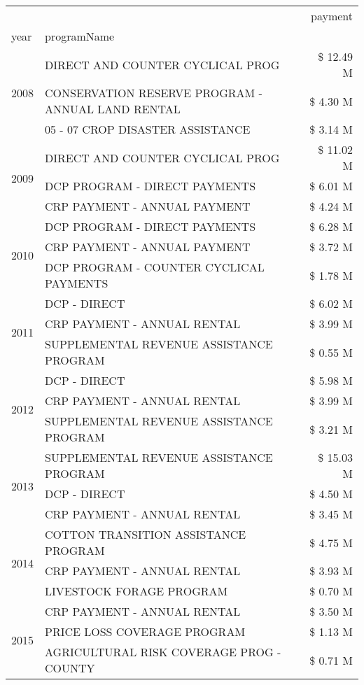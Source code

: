 \begin{tabular}{llr}
\toprule
 &  & payment \\
year & programName &  \\
\midrule
\multirow[t]{3}{*}{2008} & DIRECT AND COUNTER CYCLICAL PROG & \$ 12.49 M \\
 & CONSERVATION RESERVE PROGRAM - ANNUAL LAND RENTAL & \$ 4.30 M \\
 & 05 - 07 CROP DISASTER ASSISTANCE & \$ 3.14 M \\
\cline{1-3}
\multirow[t]{3}{*}{2009} & DIRECT AND COUNTER CYCLICAL PROG & \$ 11.02 M \\
 & DCP PROGRAM - DIRECT PAYMENTS & \$ 6.01 M \\
 & CRP PAYMENT - ANNUAL PAYMENT & \$ 4.24 M \\
\cline{1-3}
\multirow[t]{3}{*}{2010} & DCP PROGRAM - DIRECT PAYMENTS & \$ 6.28 M \\
 & CRP PAYMENT - ANNUAL PAYMENT & \$ 3.72 M \\
 & DCP PROGRAM - COUNTER CYCLICAL PAYMENTS & \$ 1.78 M \\
\cline{1-3}
\multirow[t]{3}{*}{2011} & DCP - DIRECT & \$ 6.02 M \\
 & CRP PAYMENT - ANNUAL RENTAL & \$ 3.99 M \\
 & SUPPLEMENTAL REVENUE ASSISTANCE PROGRAM & \$ 0.55 M \\
\cline{1-3}
\multirow[t]{3}{*}{2012} & DCP - DIRECT & \$ 5.98 M \\
 & CRP PAYMENT - ANNUAL RENTAL & \$ 3.99 M \\
 & SUPPLEMENTAL REVENUE ASSISTANCE PROGRAM & \$ 3.21 M \\
\cline{1-3}
\multirow[t]{3}{*}{2013} & SUPPLEMENTAL REVENUE ASSISTANCE PROGRAM & \$ 15.03 M \\
 & DCP - DIRECT & \$ 4.50 M \\
 & CRP PAYMENT - ANNUAL RENTAL & \$ 3.45 M \\
\cline{1-3}
\multirow[t]{3}{*}{2014} & COTTON TRANSITION ASSISTANCE PROGRAM & \$ 4.75 M \\
 & CRP PAYMENT - ANNUAL RENTAL & \$ 3.93 M \\
 & LIVESTOCK FORAGE PROGRAM & \$ 0.70 M \\
\cline{1-3}
\multirow[t]{3}{*}{2015} & CRP PAYMENT - ANNUAL RENTAL & \$ 3.50 M \\
 & PRICE LOSS COVERAGE PROGRAM & \$ 1.13 M \\
 & AGRICULTURAL RISK COVERAGE PROG - COUNTY & \$ 0.71 M \\

\end{tabular}
